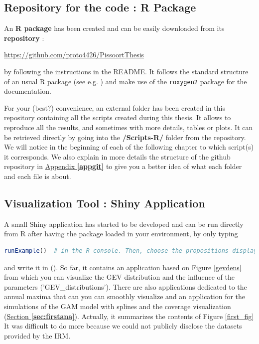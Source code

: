 
\subsection*{Repository for the code : R Package}

An \textbf{R package} has been created and can be easily downloaded from its \textbf{repository} :
\begin{center}\label{xxx}
 \url{https://github.com/proto4426/PissoortThesis}
\end{center}
by following the instructions in the README. It follows the standard structure of an usual R package (see e.g. \citet{leisch_creating_2008}) and make use of the \texttt{roxygen2} package for the documentation.

For your (best?) convenience, an external folder has been created in this repository containing all the scripts created during this thesis. It allows to reproduce all the results, and sometimes with more details, tables or plots. It can be retrieved directly by going into the \textbf{/Scripts-R/} folder from the repository. We will notice in the beginning of each of the following chapter to which script(s) it corresponds. We also explain in more details the structure of the github repository in \hyperref[appgit]{Appendix \textbf{\ref{appgit}}} to give you a better idea of what each folder and each file is about.

\subsection*{Visualization Tool : Shiny Application}

A small Shiny application has started to be developed and can be run directly from R after having the package loaded in your environment, by only typing 

\begin{center}
\begin{lstlisting}[language=R]
runExample()  # in the R console. Then, choose the propositions displayed
\end{lstlisting}
\end{center}
and write it in (). So far, it contains an application based on Figure \ref{gevdens} from which you can visualize the GEV distribution and the influence of the parameters ('GEV\_distributions'). There are also applications dedicated to the annual maxima that can you can smoothly visualize and an application for the simulations of the GAM model with splines and the coverage visualization (\hyperref[sec:firstana]{Section \textbf{\ref{sec:firstana}}}).  Actually, it summarizes the contents of Figure \ref{first_fig} It was difficult to do more because we could not publicly disclose the datasets provided by the IRM.
 
